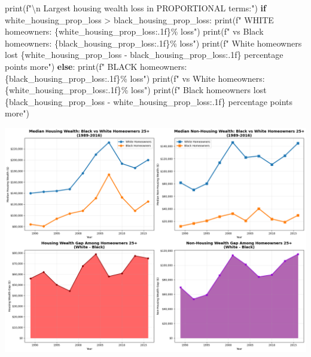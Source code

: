 \documentclass[
  letterpaper,
  DIV=11,
  numbers=noendperiod]{scrartcl}
\newenvironment{Shaded}{\begin{snugshade}}{\end{snugshade}}
\newcommand{\BuiltInTok}[1]{\textcolor[rgb]{0.00,0.23,0.31}{#1}}
\newcommand{\CharTok}[1]{\textcolor[rgb]{0.13,0.47,0.30}{#1}}
\newcommand{\ControlFlowTok}[1]{\textcolor[rgb]{0.00,0.23,0.31}{\textbf{#1}}}
\newcommand{\NormalTok}[1]{\textcolor[rgb]{0.00,0.23,0.31}{#1}}
\newcommand{\OperatorTok}[1]{\textcolor[rgb]{0.37,0.37,0.37}{#1}}
\newcommand{\SpecialCharTok}[1]{\textcolor[rgb]{0.37,0.37,0.37}{#1}}
\newcommand{\SpecialStringTok}[1]{\textcolor[rgb]{0.13,0.47,0.30}{#1}}
\begin{document}
\begin{Shaded}
\begin{Highlighting}[]
\BuiltInTok{print}\NormalTok{(}\SpecialStringTok{f"}\CharTok{\textbackslash{}n}\SpecialStringTok{   Largest housing wealth loss in PROPORTIONAL terms:"}\NormalTok{)}
\ControlFlowTok{if}\NormalTok{ white\_housing\_prop\_loss }\OperatorTok{\textgreater{}}\NormalTok{ black\_housing\_prop\_loss:}
    \BuiltInTok{print}\NormalTok{(}\SpecialStringTok{f"     WHITE homeowners: }\SpecialCharTok{\{}\NormalTok{white\_housing\_prop\_loss}\SpecialCharTok{:.1f\}}\SpecialStringTok{\% loss"}\NormalTok{)}
    \BuiltInTok{print}\NormalTok{(}\SpecialStringTok{f"     vs Black homeowners: }\SpecialCharTok{\{}\NormalTok{black\_housing\_prop\_loss}\SpecialCharTok{:.1f\}}\SpecialStringTok{\% loss"}\NormalTok{)}
    \BuiltInTok{print}\NormalTok{(}\SpecialStringTok{f"     White homeowners lost }\SpecialCharTok{\{}\NormalTok{white\_housing\_prop\_loss }\OperatorTok{{-}}\NormalTok{ black\_housing\_prop\_loss}\SpecialCharTok{:.1f\}}\SpecialStringTok{ percentage points more"}\NormalTok{)}
\ControlFlowTok{else}\NormalTok{:}
    \BuiltInTok{print}\NormalTok{(}\SpecialStringTok{f"     BLACK homeowners: }\SpecialCharTok{\{}\NormalTok{black\_housing\_prop\_loss}\SpecialCharTok{:.1f\}}\SpecialStringTok{\% loss"}\NormalTok{)}
    \BuiltInTok{print}\NormalTok{(}\SpecialStringTok{f"     vs White homeowners: }\SpecialCharTok{\{}\NormalTok{white\_housing\_prop\_loss}\SpecialCharTok{:.1f\}}\SpecialStringTok{\% loss"}\NormalTok{)}
    \BuiltInTok{print}\NormalTok{(}\SpecialStringTok{f"     Black homeowners lost }\SpecialCharTok{\{}\NormalTok{black\_housing\_prop\_loss }\OperatorTok{{-}}\NormalTok{ white\_housing\_prop\_loss}\SpecialCharTok{:.1f\}}\SpecialStringTok{ percentage points more"}\NormalTok{)}
\end{Highlighting}
\end{Shaded}

\includegraphics{main_files/figure-pdf/cell-17-output-1.png}
\end{document}
